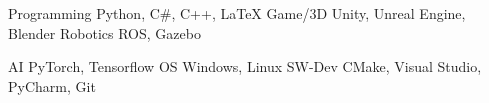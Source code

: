 \newpage
{}


\begin{cvskills}

  \cvskillnobreaktwo
    {Programming} %
    {Python, C\#, C++, \LaTeX} %
    {Game/3D} %
    {Unity, Unreal Engine, Blender} %
    {Robotics} %
    {ROS, Gazebo} %



  \cvskillnobreakthree
    {AI} %
    {PyTorch, Tensorflow} %
    {OS} %
    {Windows, Linux} %
    {SW-Dev} %
    {CMake, Visual Studio, PyCharm, Git} %
    


\end{cvskills}
